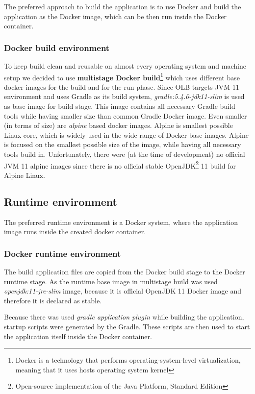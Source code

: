 The preferred approach to build the application is to use Docker
and build the application as the Docker image, 
which can be then run inside the Docker container.

\subsubsection{Docker build environment}
To keep build clean and reusable on almost every operating system and 
machine setup we decided to use 
\textbf{multistage Docker build}\footnote{Docker is a technology that performs operating-system-level virtualization,
meaning that it uses hosts operating system kernel}
which uses different base docker images for the build and for the run phase.
Since OLB targets JVM 11 environment and uses Gradle as its build system,
\textit{gradle:5.4.0-jdk11-slim} is used as base image for build stage.
This image contains all necessary Gradle build tools while having smaller size than common Gradle Docker image.
Even smaller (in terms of size) are \textit{alpine} based docker images. 
Alpine is smallest possible Linux core, 
which is widely used in the wide range of Docker base images.
Alpine is focused on the smallest possible size of the image, 
while having all necessary tools build in.
Unfortunately, there were (at the time of development) no official JVM 11 alpine images
since there is no official stable OpenJDK\footnote{Open-source implementation of the Java Platform, Standard Edition} 
11 build for Alpine Linux.

\subsection{Runtime environment}
The preferred runtime environment is a Docker system, 
where the application image runs inside the created docker container.

\subsubsection{Docker runtime environment}\label{subsubsec:docker-runtime-env}
The build application files are copied from the Docker build stage to the Docker runtime stage.
As the runtime base image in multistage build was used \textit{openjdk:11-jre-slim} image,
because it is official OpenJDK 11 Docker image and therefore it is declared as stable.

Because there was used \textit{gradle application plugin} while building the application, 
startup scripts were generated by the Gradle.
These scripts are then used to start the application itself inside the Docker container.

